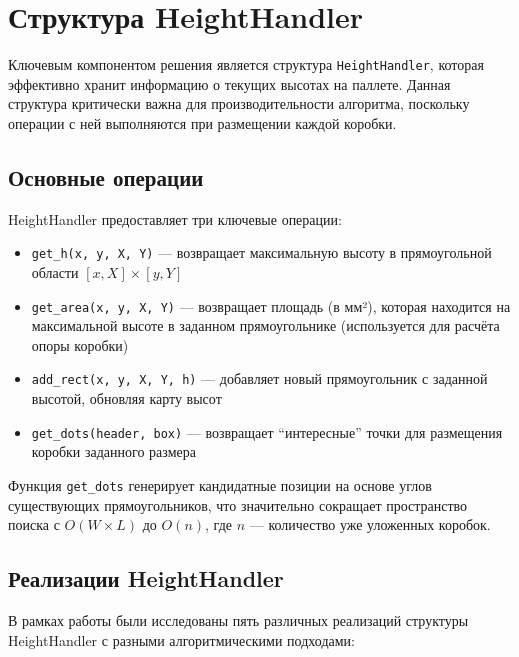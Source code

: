 \section{Структура HeightHandler}

Ключевым компонентом решения является структура \texttt{HeightHandler}, которая эффективно хранит информацию о текущих высотах на паллете. Данная структура критически важна для производительности алгоритма, поскольку операции с ней выполняются при размещении каждой коробки.

\subsection{Основные операции}

HeightHandler предоставляет три ключевые операции:

\begin{itemize}
    \item \texttt{get\_h(x, y, X, Y)} --- возвращает максимальную высоту в прямоугольной области $[x, X] \times [y, Y]$
    \item \texttt{get\_area(x, y, X, Y)} --- возвращает площадь (в мм²), которая находится на максимальной высоте в заданном прямоугольнике (используется для расчёта опоры коробки)
    \item \texttt{add\_rect(x, y, X, Y, h)} --- добавляет новый прямоугольник с заданной высотой, обновляя карту высот
    \item \texttt{get\_dots(header, box)} --- возвращает ``интересные'' точки для размещения коробки заданного размера
\end{itemize}

Функция \texttt{get\_dots} генерирует кандидатные позиции на основе углов существующих прямоугольников, что значительно сокращает пространство поиска с $O(W \times L)$ до $O(n)$, где $n$ --- количество уже уложенных коробок.


\subsection{Реализации HeightHandler}

В рамках работы были исследованы пять различных реализаций структуры HeightHandler с разными алгоритмическими подходами:

